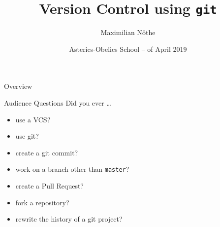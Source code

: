 \documentclass[
  aspectratio=1610,
]{beamer}
\author[M. Nöthe]{Maximilian Nöthe}
\title[VC with Git]{Version Control using \texttt{git}}
\date[April \nth{7}, 2019]{\nth{3} Asterics-Obelics School – \nth{7} of April 2019 }
\institute[TU Dortmund]{Astroparticle Physics, TU Dortmund}
\begin{document}
{
  
}
\maketitle

\begin{frame}[c]{Overview}
\tableofcontents
\end{frame}

\begin{frame}[t]{Audience Questions}
  Did you ever …
  \begin{itemize}[<+->]
    \item use a VCS?
    \item use git?
    \item create a git commit?
    \item work on a branch other than \texttt{master}?
    \item create a Pull Request?
    \item fork a repository?
    \item rewrite the history of a git project?
  \end{itemize}
\end{frame}






{
  
}
\end{document}

